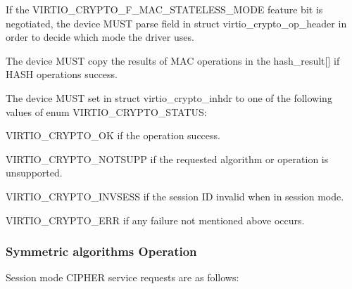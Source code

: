 
\begin{itemize*}
\item If the VIRTIO_CRYPTO_F_MAC_STATELESS_MODE feature bit is negotiated, the device
    MUST parse  field in struct virtio_crypto_op_header in order to decide
	which mode the driver uses.
\item The device MUST copy the results of MAC operations in the hash_result[] if HASH
    operations success.
\item The device MUST set  in struct virtio_crypto_inhdr to one of the
    following values of enum VIRTIO_CRYPTO_STATUS:
\begin{itemize*}
\item VIRTIO_CRYPTO_OK if the operation success.
\item VIRTIO_CRYPTO_NOTSUPP if the requested algorithm or operation is unsupported.
\item VIRTIO_CRYPTO_INVSESS if the session ID invalid when in session mode.
\item VIRTIO_CRYPTO_ERR if any failure not mentioned above occurs.
\end{itemize*}
\end{itemize*}

\subsubsection{Symmetric algorithms Operation}\label{sec:Device Types / Crypto Device / Device Operation / Symmetric algorithms Operation}

Session mode CIPHER service requests are as follows:

